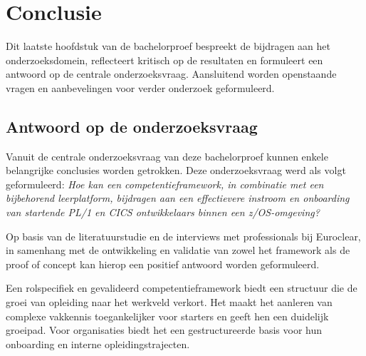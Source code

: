 
\chapter{Conclusie}%
\label{ch:conclusie}


Dit laatste hoofdstuk van de bachelorproef bespreekt de bijdragen aan het onderzoeksdomein, reflecteert kritisch op de resultaten en formuleert een antwoord op de centrale onderzoeksvraag.
Aansluitend worden openstaande vragen en aanbevelingen voor verder onderzoek geformuleerd.

\section{Antwoord op de onderzoeksvraag}%
\label{sec:conclusie-antwoord}

Vanuit de centrale onderzoeksvraag van deze bachelorproef kunnen enkele belangrijke conclusies worden getrokken.
Deze onderzoeksvraag werd als volgt geformuleerd:
\textit{Hoe kan een competentieframework, in combinatie met een bijbehorend leerplatform, bijdragen aan een effectievere instroom en onboarding van startende PL/1 en CICS ontwikkelaars binnen een z/OS-omgeving?}

Op basis van de literatuurstudie en de interviews met professionals bij Euroclear, in samenhang met de ontwikkeling en validatie van zowel het framework als de proof of concept kan hierop een positief antwoord worden geformuleerd.

Een rolspecifiek en gevalideerd competentieframework biedt een structuur die de groei van opleiding naar het werkveld verkort.
Het maakt het aanleren van complexe vakkennis toegankelijker voor starters en geeft hen een duidelijk groeipad.
Voor organisaties biedt het een gestructureerde basis voor hun onboarding en interne opleidingstrajecten.

